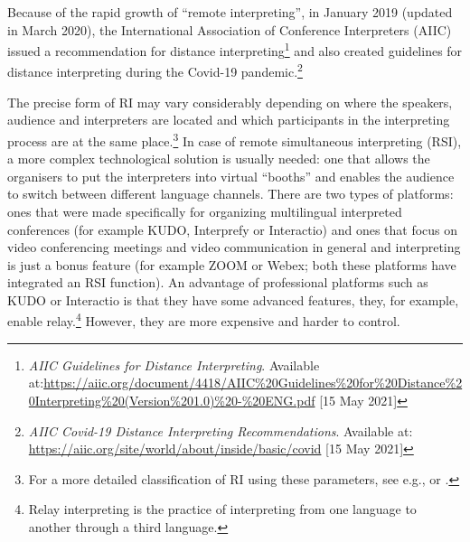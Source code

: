 \documentclass[output=paper]{langscibook}
\begin{document}
Because of the rapid growth of “remote interpreting”, in  {January 2019} (updated in  {March 2020}), the International Association of Conference Interpreters (AIIC) issued a recommendation for distance interpreting\footnote{{\textit{AIIC Guidelines for Distance Interpreting}}{. Available at:}\url{https://aiic.org/document/4418/AIIC\%20Guidelines\%20for\%20Distance\%20Interpreting\%20(Version\%201.0)\%20-\%20ENG.pdf} {[15  {May 2021}]}} and also created guidelines for distance interpreting during the Covid-19 pandemic.\footnote{{\textit{AIIC Covid-19 Distance Interpreting Recommendations}}{. Available at:} \url{https://aiic.org/site/world/about/inside/basic/covid} {[15  {May 2021}]}}

The precise form of RI may vary considerably depending on where the speakers, audience and interpreters are located and which participants in the interpreting process are at the same place.\footnote{{For a more detailed classification of RI using these parameters, see e.g., \citealt{Braun2015} or \citealt{ZieglerGigliobianco2018}.}} In case of remote simultaneous interpreting (RSI), a more complex technological solution is usually needed: one that allows the organisers to put the interpreters into virtual “booths” and enables the audience to switch between different language channels. There are two types of platforms: ones that were made specifically for organizing multilingual interpreted conferences (for example KUDO, Interprefy or Interactio) and ones that focus on video conferencing meetings and video communication in general and interpreting is just a bonus feature (for example ZOOM or Webex; both these platforms have integrated an RSI function). An advantage of professional platforms such as KUDO or Interactio is that they have some advanced features, they, for example, enable relay.\footnote{{Relay interpreting is the practice of interpreting from one language to another through a third language.}} However, they are more expensive and harder to control.
\end{document}
